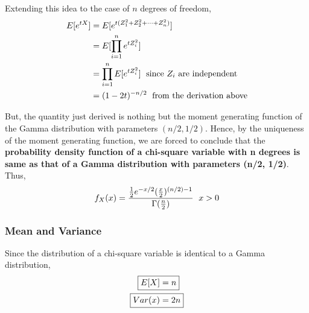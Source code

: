 \documentclass[../probability-notes.tex]{subfiles}
\begin{document}
    Extending this idea to the case of $n$ degrees of freedom,
    \begin{align*}
        E[e^{tX}] &= E[e^{t(Z_{1}^{2} + Z_{2}^{2} + \cdots + Z_{n}^{2})}]\\
        &= E[\prod_{i=1}^{n} e^{t Z_{i}^{2}}]\\
        &= \prod_{i=1}^{n} E[e^{t Z_{i}^{2}}] \text{\; since $Z_{i}$ are independent}\\
        &= (1 - 2t)^{-n/2} \text{\; from the derivation above}
    \end{align*}

    But, the quantity just derived is nothing but the moment generating function of the Gamma distribution with parameters $(n/2, 1/2)$. Hence, by the uniqueness of the moment generating function, we are forced to conclude that the \textbf{probability density function of a chi-square variable with n degrees is same as that of a Gamma distribution with parameters (n/2, 1/2)}.\newline
    Thus,
    \begin{align*}
        f_{X}(x) = \frac{\frac{1}{2} e^{-x/2} (\frac{x}{2})^{(n/2) - 1}}{\Gamma(\frac{n}{2})} \text{\; $x > 0$}
    \end{align*}
    \subsubsection{Mean and Variance}
    Since the distribution of a chi-square variable is identical to a Gamma distribution,
    \begin{align*}
        \Aboxed{E[X] &= n}\\
        \Aboxed{Var(x) &= 2n}
    \end{align*}
\end{document}
